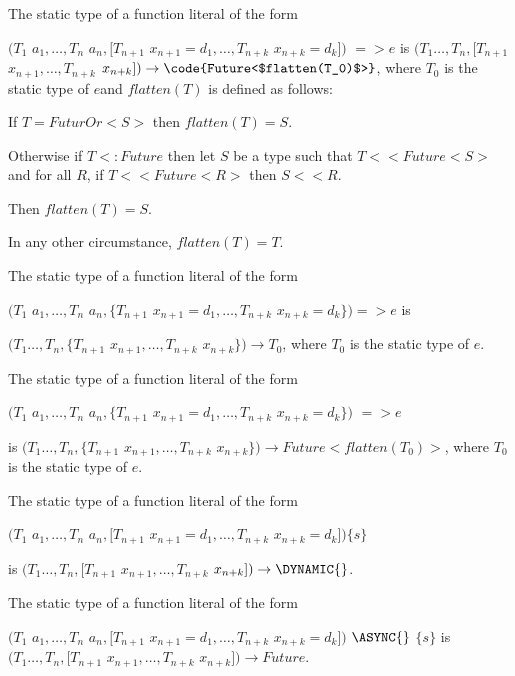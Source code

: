 \documentclass{article}
\begin{document}
\LMHash{}
The static type of a function literal of the form

$(T_1$ $a_1, \ldots, T_n$ $a_n, [T_{n+1}$ $x_{n+1} = d_1, \ldots,  T_{n+k}$ $x_{n+k} = d_k])$ \ASYNC{} $=> e$
is $(T_1 \ldots, T_n, [T_{n+1}$ $x_{n+1}, \ldots, T_{n+k}$ $x_{n+k}]) \rightarrow \code{Future<$flatten(T_0)$>}$, where $T_0$ is the static type of $e$and $flatten(T)$ is defined as follows:

If $T = FuturOr<S>$ then $flatten(T) = S$.

Otherwise if $T <: Future$ then let $S$ be a type such that $T << Future<S>$ and for all $R$, if $T << Future<R>$ then $S << R$.


Then $flatten(T) = S$.

In any other circumstance, $flatten(T) = T$.

\LMHash{}
The static type of a function literal of the form

$(T_1$ $a_1, \ldots, T_n$ $a_n, \{T_{n+1}$ $x_{n+1} = d_1, \ldots, T_{n+k}$ $x_{n+k} = d_k\}) => e$
is

$(T_1 \ldots, T_n, \{T_{n+1}$ $x_{n+1}, \ldots, T_{n+k}$ $x_{n+k}\}) \rightarrow T_0$, where $T_0$ is the static type of $e$.

\LMHash{}
The static type of a function literal of the form

$(T_1$ $a_1, \ldots, T_n$ $a_n, \{T_{n+1}$ $x_{n+1} = d_1, \ldots, T_{n+k}$ $x_{n+k} = d_k\})$ \ASYNC{} $=> e$

is $(T_1 \ldots, T_n, \{T_{n+1}$ $x_{n+1}, \ldots, T_{n+k}$ $x_{n+k}\}) \rightarrow Future<flatten(T_0)>$, where $T_0$ is the static type of $e$.

\LMHash{}
The static type of a function literal of the form

$(T_1$ $a_1, \ldots, T_n$ $a_n, [T_{n+1}$ $x_{n+1} = d_1, \ldots, T_{n+k}$ $x_{n+k}= d_k])\{s\}$

is $(T_1 \ldots, T_n, [T_{n+1}$ $x_{n+1}, \ldots, T_{n+k}$ $x_{n+k}]) \rightarrow \DYNAMIC{}$.

\LMHash{}
The static type of a function literal of the form

$(T_1$ $a_1, \ldots, T_n$ $a_n, [T_{n+1}$ $x_{n+1} = d_1, \ldots, T_{n+k}$ $x_{n+k}= d_k])$ $ \ASYNC{}$ $\{s\}$
is $(T_1 \ldots, T_n, [T_{n+1}$ $x_{n+1}, \ldots, T_{n+k}$ $x_{n+k}]) \rightarrow Future$.
\end{document}
